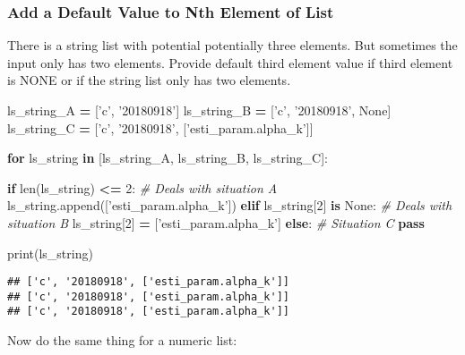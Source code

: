 \documentclass[
]{book}
\newenvironment{Shaded}{\begin{snugshade}}{\end{snugshade}}
\newcommand{\BuiltInTok}[1]{#1}
\newcommand{\CommentTok}[1]{\textcolor[rgb]{0.56,0.35,0.01}{\textit{#1}}}
\newcommand{\ControlFlowTok}[1]{\textcolor[rgb]{0.13,0.29,0.53}{\textbf{#1}}}
\newcommand{\DecValTok}[1]{\textcolor[rgb]{0.00,0.00,0.81}{#1}}
\newcommand{\KeywordTok}[1]{\textcolor[rgb]{0.13,0.29,0.53}{\textbf{#1}}}
\newcommand{\NormalTok}[1]{#1}
\newcommand{\OperatorTok}[1]{\textcolor[rgb]{0.81,0.36,0.00}{\textbf{#1}}}
\newcommand{\StringTok}[1]{\textcolor[rgb]{0.31,0.60,0.02}{#1}}
\newcommand{\VariableTok}[1]{\textcolor[rgb]{0.00,0.00,0.00}{#1}}
\begin{document}
\hypertarget{add-a-default-value-to-nth-element-of-list}{%
\subsubsection{Add a Default Value to Nth Element of List}\label{add-a-default-value-to-nth-element-of-list}}

There is a string list with potential potentially three elements. But sometimes the input only has two elements. Provide default third element value if third element is NONE or if the string list only has two elements.

\begin{Shaded}
\begin{Highlighting}[]

\NormalTok{ls_string_A }\OperatorTok{=}\NormalTok{ [}\StringTok{'c'}\NormalTok{, }\StringTok{'20180918'}\NormalTok{]}
\NormalTok{ls_string_B }\OperatorTok{=}\NormalTok{ [}\StringTok{'c'}\NormalTok{, }\StringTok{'20180918'}\NormalTok{, }\VariableTok{None}\NormalTok{]}
\NormalTok{ls_string_C }\OperatorTok{=}\NormalTok{ [}\StringTok{'c'}\NormalTok{, }\StringTok{'20180918'}\NormalTok{, [}\StringTok{'esti_param.alpha_k'}\NormalTok{]]}

\ControlFlowTok{for}\NormalTok{ ls_string }\KeywordTok{in}\NormalTok{ [ls_string_A, ls_string_B, ls_string_C]:}

  \ControlFlowTok{if} \BuiltInTok{len}\NormalTok{(ls_string) }\OperatorTok{<=} \DecValTok{2}\NormalTok{:}
    \CommentTok{# Deals with situation A}
\NormalTok{    ls_string.append([}\StringTok{'esti_param.alpha_k'}\NormalTok{])}
  \ControlFlowTok{elif}\NormalTok{ ls_string[}\DecValTok{2}\NormalTok{] }\KeywordTok{is} \VariableTok{None}\NormalTok{:}
    \CommentTok{# Deals with situation B}
\NormalTok{    ls_string[}\DecValTok{2}\NormalTok{] }\OperatorTok{=}\NormalTok{ [}\StringTok{'esti_param.alpha_k'}\NormalTok{]}
  \ControlFlowTok{else}\NormalTok{:}
    \CommentTok{# Situation C}
    \ControlFlowTok{pass}

  \BuiltInTok{print}\NormalTok{(ls_string)}
\end{Highlighting}
\end{Shaded}

\begin{verbatim}
## ['c', '20180918', ['esti_param.alpha_k']]
## ['c', '20180918', ['esti_param.alpha_k']]
## ['c', '20180918', ['esti_param.alpha_k']]
\end{verbatim}

Now do the same thing for a numeric list:
\end{document}

